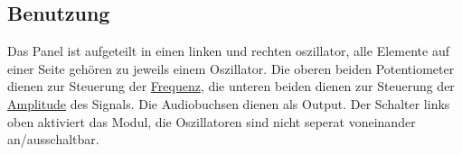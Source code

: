 \subsection{Benutzung}
\label{sec:org3cb5577}
Das Panel ist aufgeteilt in einen linken und rechten oszillator, alle Elemente auf einer Seite gehören zu jeweils einem Oszillator. Die oberen beiden Potentiometer dienen zur Steuerung der \href{file:///home/felixp/Documents/diplomarbeit/dokumentation/content/theoretische\_grundlagen.org}{Frequenz}, die unteren beiden dienen zur Steuerung der \href{file:///home/felixp/Documents/diplomarbeit/dokumentation/content/theoretische\_grundlagen.org}{Amplitude} des Signals. Die Audiobuchsen dienen als Output. Der Schalter links oben aktiviert das Modul, die Oszillatoren sind nicht seperat voneinander an/ausschaltbar.
